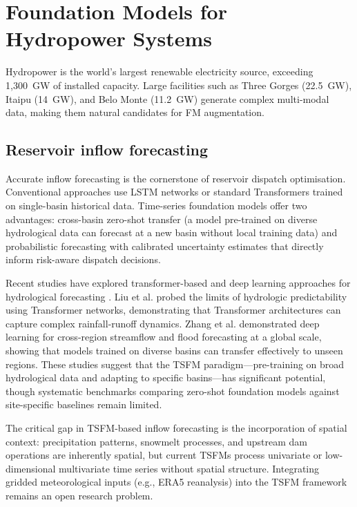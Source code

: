 \documentclass[preprint,12pt]{elsarticle}
\begin{document}
\section{Foundation Models for Hydropower Systems}
\label{sec:hydro}

Hydropower is the world's largest renewable electricity source, exceeding 1{,}300~GW of installed capacity. Large facilities such as Three Gorges (22.5~GW), Itaipu (14~GW), and Belo Monte (11.2~GW) generate complex multi-modal data, making them natural candidates for FM augmentation.

\subsection{Reservoir inflow forecasting}
\label{subsec:inflow_forecasting}

Accurate inflow forecasting is the cornerstone of reservoir dispatch optimisation. Conventional approaches use LSTM networks \cite{yaseen2019lstm_streamflow} or standard Transformers \cite{demiray2024transformer_streamflow} trained on single-basin historical data. Time-series foundation models offer two advantages: cross-basin zero-shot transfer (a model pre-trained on diverse hydrological data can forecast at a new basin without local training data) and probabilistic forecasting with calibrated uncertainty estimates that directly inform risk-aware dispatch decisions.

Recent studies have explored transformer-based and deep learning approaches for hydrological forecasting \cite{liu2024transformer_hydrologic, zhang2024crossregion_streamflow}. Liu et al. \cite{liu2024transformer_hydrologic} probed the limits of hydrologic predictability using Transformer networks, demonstrating that Transformer architectures can capture complex rainfall-runoff dynamics. Zhang et al. \cite{zhang2024crossregion_streamflow} demonstrated deep learning for cross-region streamflow and flood forecasting at a global scale, showing that models trained on diverse basins can transfer effectively to unseen regions. These studies suggest that the TSFM paradigm---pre-training on broad hydrological data and adapting to specific basins---has significant potential, though systematic benchmarks comparing zero-shot foundation models against site-specific baselines remain limited.

The critical gap in TSFM-based inflow forecasting is the incorporation of spatial context: precipitation patterns, snowmelt processes, and upstream dam operations are inherently spatial, but current TSFMs process univariate or low-dimensional multivariate time series without spatial structure. Integrating gridded meteorological inputs (e.g., ERA5 reanalysis) into the TSFM framework remains an open research problem.
\end{document}

